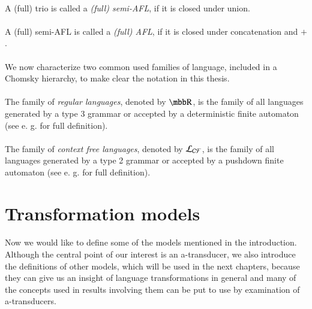 \paragraph{}
 A (full) trio is called a \emph{(full) semi-AFL}, if it is closed under union.

\paragraph{}
 A (full) semi-AFL is called a \emph{(full) AFL}, if it is closed under concatenation and $+$.

\paragraph{}
We now characterize two common used families of language, included in a Chomsky hierarchy, to make clear the notation in this thesis.

\paragraph{}
\oznacenie The family of \emph{regular languages}, denoted by $\R $, is the family of all languages generated by a type 3 grammar or accepted by a deterministic finite automaton (see e. g. \cite{hopcroft:fola} for full definition).

\paragraph{}
\oznacenie The family of \emph{context free languages}, denoted by $\CF $, is the family of all languages generated by a type 2 grammar or accepted by a pushdown finite automaton (see e. g. \cite{hopcroft:fola} for full definition).

\section{Transformation models}
\paragraph{}
Now we would like to define some of the models mentioned in the introduction. Although the central point of our interest is an a-transducer, we also introduce the definitions of other models, which will be used in the next chapters, because they can give us an insight of language transformations in general and many of the concepts used in results involving them can be put to use by examination of a-transducers.

